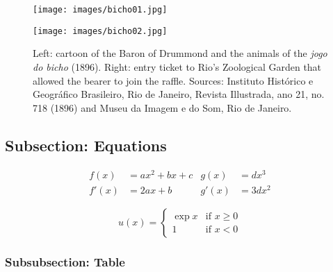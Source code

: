 \documentclass[a4paper,12pt]{article}
\begin{document}
\begin{figure}[!htbp]
 \centering
 \begin{minipage}[b]{0.45\textwidth}
  \texttt{[image: images/bicho01.jpg]}
 \end{minipage}
 \hfill
 \begin{minipage}[b]{0.45\textwidth}
  \texttt{[image: images/bicho02.jpg]}
 \end{minipage}
 \caption{Left: cartoon of the Baron of Drummond and the animals of the \emph{jogo do bicho} (1896). Right: entry ticket to Rio's Zoological Garden that allowed the bearer to join the raffle. Sources: Instituto Histórico e Geográfico Brasileiro, Rio de Janeiro, Revista Illustrada, ano 21, no. 718 (1896) and Museu da Imagem e do Som, Rio de Janeiro.}
 \label{fig:barao}
\end{figure}

\newpage

\subsection{Subsection: Equations}
\label{sub:eq}

\begin{align}
 f(x)  &= a x^2+b x +c   &   g(x)  &= d x^3 \\
 f'(x) &= 2 a x +b       &   g'(x) &= 3 d x^2
\end{align}


\begin{equation}
  u(x) =
  \begin{cases}
   \exp{x} & \text{if } x \geq 0 \\
   1       & \text{if } x < 0
  \end{cases}
\end{equation}

\vspace{.5cm}

\subsubsection{Subsubsection: Table}
\label{subsub:table}

\def\onepc{$^{\ast\ast}$} \def\fivepc{$^{\ast}$}
\def\tenpc{$^{\dag}$}
\def\legend{\multicolumn{4}{l}{\footnotesize{Significance levels
:\hspace{1em} $\dag$ : .1 \hspace{1em}
$\ast$ : .05 \hspace{1em} $\ast\ast$ : .01 \normalsize}}}
\end{document}
